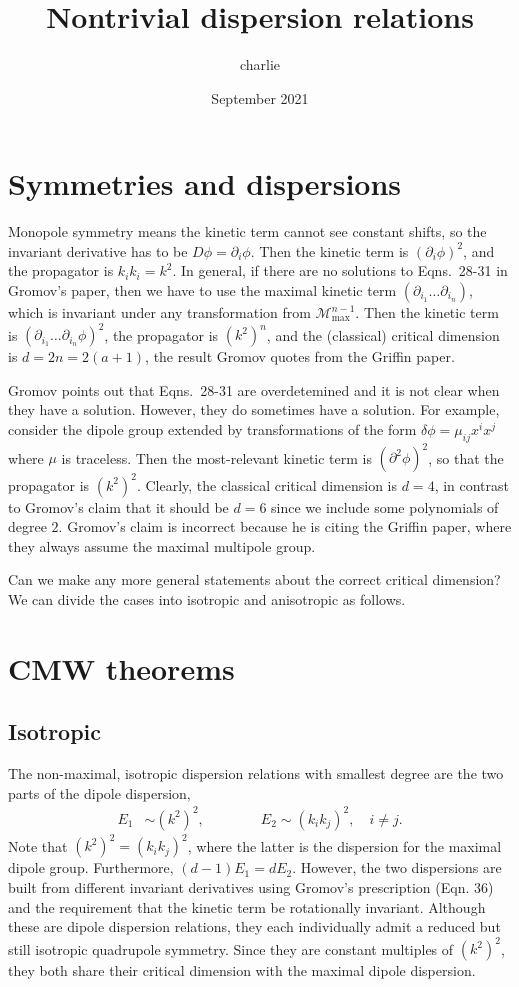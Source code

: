 \documentclass[12pt]{article}
\title{Nontrivial dispersion relations}
\author{charlie}
\date{September 2021}
\begin{document}
\maketitle

\section{Symmetries and dispersions}

Monopole symmetry means the kinetic term cannot see constant shifts, so the invariant derivative has to be $D\phi = \partial_i \phi$. Then the kinetic term is $(\partial_i\phi)^2$, and the propagator is $k_ik_i = k^2$. In general, if there are no solutions to Eqns.~28-31 in Gromov's paper, then we have to use the maximal kinetic term $(\partial_{i_1}\dots \partial_{i_n})$, which is invariant under any transformation from $\mathcal{M}_\text{max}^{n-1}$. Then the kinetic term is $(\partial_{i_1}\dots \partial_{i_n} \phi)^2$, the propagator is $(k^2)^n$, and the (classical) critical dimension is $d=2n = 2(a+1)$, the result Gromov quotes from the Griffin paper. 

Gromov points out that Eqns.~28-31 are overdetemined and it is not clear when they have a solution. However, they do sometimes have a solution. For example, consider the dipole group extended by transformations of the form $\delta \phi = \mu_{ij}x^ix^j$ where $\mu$ is traceless. Then the most-relevant kinetic term is $(\partial^2 \phi)^2$, so that the propagator is $(k^2)^2$. Clearly, the classical critical dimension is $d=4$, in contrast to Gromov's claim that it should be $d=6$ since we include some polynomials of degree $2$. Gromov's claim is incorrect because he is citing the Griffin paper, where they always assume the maximal multipole group.

Can we make any more general statements about the correct critical dimension? We can divide the cases into isotropic and anisotropic as follows.

\section{CMW theorems}

\subsection{Isotropic}

The non-maximal, isotropic dispersion relations with smallest degree are the two parts of the dipole dispersion,
\begin{align}
E_1 &\sim (k^2)^2, \qquad \qquad E_2 \sim (k_i k_j)^2, \quad i\ne j.
\end{align}
Note that $(k^2)^2 = (k_ik_j)^2$, where the latter is the dispersion for the maximal dipole group. Furthermore, $(d-1)E_1=dE_2$. However, the two dispersions are built from different invariant derivatives using Gromov's prescription (Eqn. 36) and the requirement that the kinetic term be rotationally invariant.
Although these are dipole dispersion relations, they each individually admit a reduced but still isotropic quadrupole symmetry. Since they are constant multiples of $(k^2)^2$, they both share their critical dimension with the maximal dipole dispersion.
\end{document}
